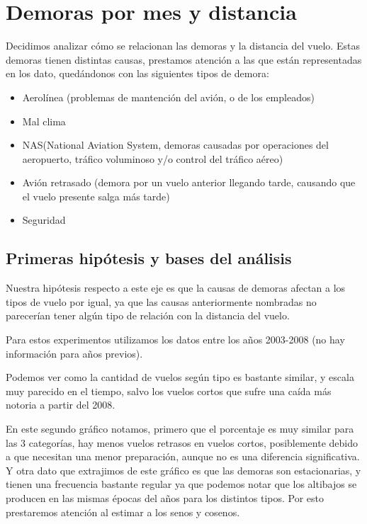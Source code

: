 \section{Demoras por mes y distancia}

Decidimos analizar cómo se relacionan las demoras y la distancia del vuelo. Estas demoras tienen distintas causas, prestamos atención a las que están representadas en los dato, quedándonos con las siguientes tipos de demora:
\begin{itemize}
\item Aerolínea (problemas de mantención del avión, o de los empleados)
\item Mal clima
\item NAS(National Aviation System, demoras causadas por operaciones del aeropuerto, tráfico voluminoso y/o control del tráfico aéreo)
\item Avión retrasado (demora por un vuelo anterior llegando tarde, causando que el vuelo presente salga más tarde)
\item Seguridad
\end{itemize}

\subsection{Primeras hipótesis y bases del análisis}

Nuestra hipótesis respecto a este eje es que la causas de demoras afectan a los tipos de vuelo por igual, ya que las causas anteriormente nombradas no parecerían tener algún tipo de relación con la distancia del vuelo.

Para estos experimentos utilizamos los datos entre los años 2003-2008 (no hay información para años previos). 


Podemos ver como la cantidad de vuelos según tipo es bastante similar, y escala muy parecido en el tiempo, salvo los vuelos cortos que sufre una caída más notoria a partir del 2008.


En este segundo gráfico notamos, primero que el porcentaje es muy similar para las 3 categorías, hay menos vuelos retrasos en vuelos cortos, posiblemente debido a que necesitan una menor preparación, aunque no es una diferencia significativa. Y otra dato que extrajimos de este gráfico es que las demoras son estacionarias, y tienen una frecuencia bastante regular ya que podemos notar que los altibajos se producen en las mismas épocas del años para los distintos tipos. Por esto prestaremos atención al estimar a los senos y cosenos.


